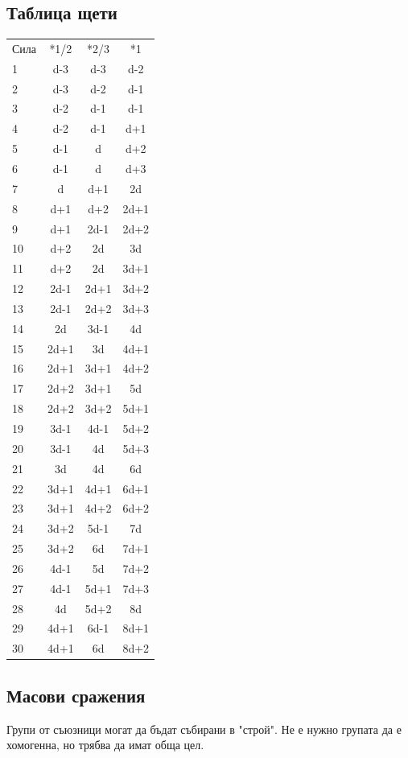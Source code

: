 \subsection{Таблица щети}
\begin{table}
\begin{tabular}{l | c | c | c}
Сила & *1/2 & *2/3 & *1  \\
1  & d-3  & d-3  & d-2   \\
2  & d-3  & d-2  & d-1   \\
3  & d-2  & d-1  & d-1   \\
4  & d-2  & d-1  & d+1   \\
5  & d-1  & d    & d+2   \\
6  & d-1  & d    & d+3   \\
7  & d    & d+1  & 2d    \\
8  & d+1  & d+2  & 2d+1  \\
9  & d+1  & 2d-1 & 2d+2  \\
10 & d+2  & 2d   & 3d    \\
11 & d+2  & 2d   & 3d+1  \\
12 & 2d-1 & 2d+1 & 3d+2  \\
13 & 2d-1 & 2d+2 & 3d+3  \\
14 & 2d   & 3d-1 & 4d    \\
15 & 2d+1 & 3d   & 4d+1  \\
16 & 2d+1 & 3d+1 & 4d+2  \\
17 & 2d+2 & 3d+1 & 5d    \\
18 & 2d+2 & 3d+2 & 5d+1  \\
19 & 3d-1 & 4d-1 & 5d+2  \\
20 & 3d-1 & 4d   & 5d+3  \\
21 & 3d   & 4d   & 6d    \\
22 & 3d+1 & 4d+1 & 6d+1  \\
23 & 3d+1 & 4d+2 & 6d+2  \\
24 & 3d+2 & 5d-1 & 7d    \\
25 & 3d+2 & 6d   & 7d+1  \\
26 & 4d-1 & 5d   & 7d+2  \\
27 & 4d-1 & 5d+1 & 7d+3  \\
28 & 4d   & 5d+2 & 8d    \\
29 & 4d+1 & 6d-1 & 8d+1  \\
30 & 4d+1 & 6d   & 8d+2
\end{tabular}
\end{table}

\subsection{Масови сражения}
Групи от съюзници могат да бъдат събирани в "строй".
Не е нужно групата да е хомогенна, но трябва да имат обща цел.

